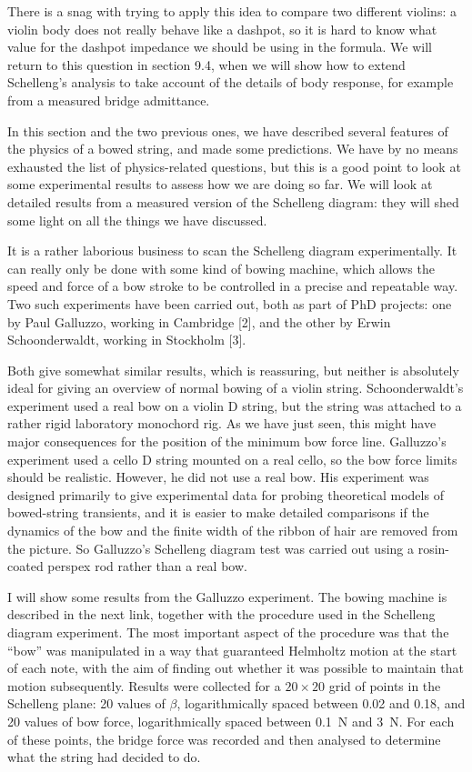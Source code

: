  There is a snag with trying to apply this idea to compare two different 
  violins: a violin body does not really behave like a dashpot, so it is hard 
  to know what value for the dashpot impedance we should be using in the 
  formula. We will return to this question in section 9.4, when we will show 
  how to extend Schelleng’s analysis to take account of the details of body 
  response, for example from a measured bridge admittance. 

  In this section and the two previous ones, we have described several features 
  of the physics of a bowed string, and made some predictions. We have by no 
  means exhausted the list of physics-related questions, but this is a good 
  point to look at some experimental results to assess how we are doing so far. 
  We will look at detailed results from a measured version of the Schelleng 
  diagram: they will shed some light on all the things we have discussed. 

  It is a rather laborious business to scan the Schelleng diagram 
  experimentally. It can really only be done with some kind of bowing machine, 
  which allows the speed and force of a bow stroke to be controlled in a 
  precise and repeatable way. Two such experiments have been carried out, both 
  as part of PhD projects: one by Paul Galluzzo, working in Cambridge [2], and 
  the other by Erwin Schoonderwaldt, working in Stockholm [3]. 

  Both give somewhat similar results, which is reassuring, but neither is 
  absolutely ideal for giving an overview of normal bowing of a violin string. 
  Schoonderwaldt’s experiment used a real bow on a violin D string, but the 
  string was attached to a rather rigid laboratory monochord rig. As we have 
  just seen, this might have major consequences for the position of the minimum 
  bow force line. Galluzzo’s experiment used a cello D string mounted on a real 
  cello, so the bow force limits should be realistic. However, he did not use a 
  real bow. His experiment was designed primarily to give experimental data for 
  probing theoretical models of bowed-string transients, and it is easier to 
  make detailed comparisons if the dynamics of the bow and the finite width of 
  the ribbon of hair are removed from the picture. So Galluzzo’s Schelleng 
  diagram test was carried out using a rosin-coated perspex rod rather than a 
  real bow. 

  I will show some results from the Galluzzo experiment. The bowing machine is 
  described in the next link, together with the procedure used in the Schelleng 
  diagram experiment. The most important aspect of the procedure was that the 
  ``bow'' was manipulated in a way that guaranteed Helmholtz motion at the 
  start of each note, with the aim of finding out whether it was possible to 
  maintain that motion subsequently. Results were collected for a $20 \times 
  20$ grid of points in the Schelleng plane: 20 values of $\beta$, 
  logarithmically spaced between 0.02 and 0.18, and 20 values of bow force, 
  logarithmically spaced between 0.1~N and 3~N. For each of these points, the 
  bridge force was recorded and then analysed to determine what the string had 
  decided to do. 

